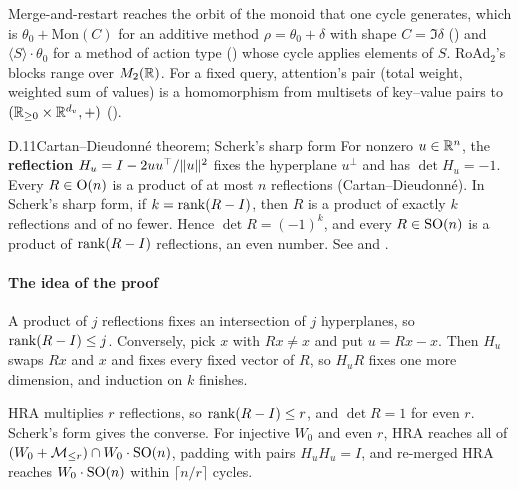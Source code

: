 Merge-and-restart reaches the orbit of the monoid that one cycle generates, which is $\theta_0+\mathrm{Mon}(C)$ for an
additive method $\rho=\theta_0+\delta$ with shape $C=\Im\delta$ () and $\langle S\rangle\cdot\theta_0$ for a
method of action type () whose cycle applies elements of $S$. RoAd$_2$'s blocks range over $M_2(\mathbb{R})$. For a
fixed query, attention's pair (total weight, weighted sum of values) is a homomorphism from multisets of key--value
pairs to $(\mathbb{R}_{\ge0}\times\mathbb{R}^{d_v},+)$ ().


\begin{bgfact}{D.11}{Cartan--Dieudonné theorem; Scherk's sharp form}
For nonzero $u\in\mathbb{R}^n$, the \textbf{reflection} $H_u=I-2uu^{\top}/\|u\|^2$ fixes the hyperplane $u^\perp$ and has $\det
H_u=-1$. Every $R\in\mathrm{O}(n)$ is a product of at most $n$ reflections (Cartan--Dieudonné). In Scherk's sharp form, if
$k=\operatorname{rank}(R-I)$, then $R$ is a product of exactly $k$ reflections and of no fewer. Hence $\det R=(-1)^k$, and every
$R\in\mathrm{SO}(n)$ is a product of $\operatorname{rank}(R-I)$ reflections, an even number. See \citet{xscherk1950decomposition} and
\citet[Ch.~III]{xartin1957geometric}.
\end{bgfact}

\paragraph{The idea of the proof}
A product of $j$ reflections fixes an intersection of $j$ hyperplanes, so $\operatorname{rank}(R-I)\le j$. Conversely, pick $x$ with
$Rx\ne x$ and put $u=Rx-x$. Then $H_u$ swaps $Rx$ and $x$ and fixes every fixed vector of $R$, so $H_uR$ fixes one more
dimension, and induction on $k$ finishes.

HRA multiplies $r$ reflections, so $\operatorname{rank}(R-I)\le r$, and $\det R=1$ for even $r$. Scherk's form gives the converse. For
injective $W_0$ and even $r$, HRA reaches all of $(W_0+\mathcal{M}_{\le r})\cap W_0\cdot\mathrm{SO}(n)$, padding with pairs $H_uH_u=I$, and
re-merged HRA reaches $W_0\cdot\mathrm{SO}(n)$ within $\lceil n/r\rceil$ cycles.


